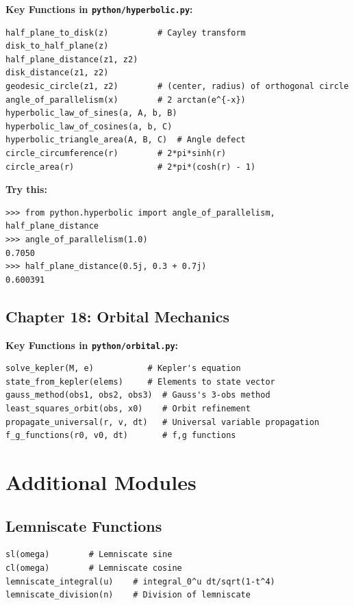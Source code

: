 \documentclass[11pt,a4paper]{article}
\begin{document}
\textbf{Key Functions in \texttt{python/hyperbolic.py}:}
\begin{lstlisting}[style=python]
half_plane_to_disk(z)          # Cayley transform
disk_to_half_plane(z)
half_plane_distance(z1, z2)
disk_distance(z1, z2)
geodesic_circle(z1, z2)        # (center, radius) of orthogonal circle
angle_of_parallelism(x)        # 2 arctan(e^{-x})
hyperbolic_law_of_sines(a, A, b, B)
hyperbolic_law_of_cosines(a, b, C)
hyperbolic_triangle_area(A, B, C)  # Angle defect
circle_circumference(r)        # 2*pi*sinh(r)
circle_area(r)                 # 2*pi*(cosh(r) - 1)
\end{lstlisting}

\textbf{Try this:}
\begin{lstlisting}[style=python]
>>> from python.hyperbolic import angle_of_parallelism, half_plane_distance
>>> angle_of_parallelism(1.0)
0.7050
>>> half_plane_distance(0.5j, 0.3 + 0.7j)
0.600391
\end{lstlisting}

\subsection{Chapter 18: Orbital Mechanics}

\textbf{Key Functions in \texttt{python/orbital.py}:}
\begin{lstlisting}[style=python]
solve_kepler(M, e)           # Kepler's equation
state_from_kepler(elems)     # Elements to state vector
gauss_method(obs1, obs2, obs3)  # Gauss's 3-obs method
least_squares_orbit(obs, x0)    # Orbit refinement
propagate_universal(r, v, dt)   # Universal variable propagation
f_g_functions(r0, v0, dt)       # f,g functions
\end{lstlisting}

\section{Additional Modules}

\subsection{Lemniscate Functions}
\begin{lstlisting}[style=python]
sl(omega)        # Lemniscate sine
cl(omega)        # Lemniscate cosine
lemniscate_integral(u)    # integral_0^u dt/sqrt(1-t^4)
lemniscate_division(n)    # Division of lemniscate
\end{lstlisting}
\end{document}
